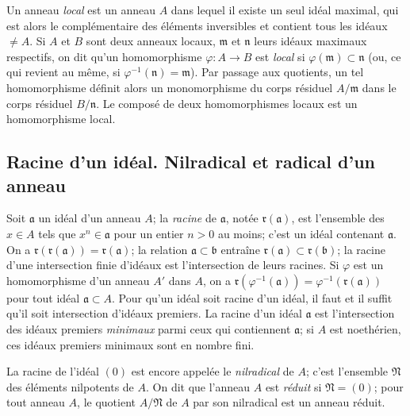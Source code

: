 \begin{env}[1.0.7]
\label{0.1.0.7-fr}
Un anneau \emph{local} est un anneau $A$ dans lequel il existe un seul idéal maximal, qui est alors le complémentaire des éléments inversibles et contient tous les idéaux $\neq A$.
Si $A$ et $B$ sont deux anneaux locaux, $\mathfrak{m}$ et $\mathfrak{n}$ leurs idéaux maximaux respectifs, on dit qu'un homomorphisme $\varphi:A\to B$ est \emph{local} si $\varphi(\mathfrak{m})\subset\mathfrak{n}$ (ou, ce qui revient au même, si $\varphi^{-1}(\mathfrak{n})=\mathfrak{m}$).
Par passage aux quotients, un tel homomorphisme définit alors un monomorphisme du corps résiduel $A/\mathfrak{m}$ dans le corps résiduel $B/\mathfrak{n}$.
Le composé de deux homomorphismes locaux est un homomorphisme local.
\end{env}

\subsection{Racine d'un idéal. Nilradical et radical d'un anneau}
\label{subsection:0.1.1-fr}

\begin{env}[1.1.1]
\label{0.1.1.1-fr}
Soit $\mathfrak{a}$ un idéal d'un anneau $A$; la \emph{racine} de $\mathfrak{a}$, notée $\mathfrak{r}(\mathfrak{a})$, est l'ensemble des $x\in A$ tels que $x^n\in\mathfrak{a}$ pour un entier $n>0$ au moins; c'est un idéal contenant $\mathfrak{a}$.
On a $\mathfrak{r}(\mathfrak{r}(\mathfrak{a}))=\mathfrak{r}(\mathfrak{a})$; la relation $\mathfrak{a}\subset\mathfrak{b}$ entraîne $\mathfrak{r}(\mathfrak{a})\subset\mathfrak{r}(\mathfrak{b})$; la racine d'une intersection finie d'idéaux est l'intersection de leurs racines.
Si $\varphi$ est un homomorphisme d'un anneau $A'$ dans $A$, on a $\mathfrak{r}(\varphi^{-1}(\mathfrak{a}))=\varphi^{-1}(\mathfrak{r}(\mathfrak{a}))$ pour tout idéal $\mathfrak{a}\subset A$.
Pour qu'un idéal soit racine d'un idéal, il faut et il suffit qu'il soit intersection d'idéaux premiers.
La racine d'un idéal $\mathfrak{a}$ est l'intersection des idéaux premiers \emph{minimaux} parmi ceux qui contiennent $\mathfrak{a}$; si $A$ est noethérien, ces idéaux premiers minimaux sont en nombre fini.

La racine de l'idéal $(0)$ est encore appelée le \emph{nilradical} de $A$; c'est l'ensemble $\mathfrak{N}$ des éléments nilpotents de $A$.
On dit que l'anneau $A$ est \emph{réduit} si $\mathfrak{N}=(0)$; pour tout anneau $A$, le quotient $A/\mathfrak{N}$ de $A$ par son nilradical est un anneau réduit.
\end{env}

